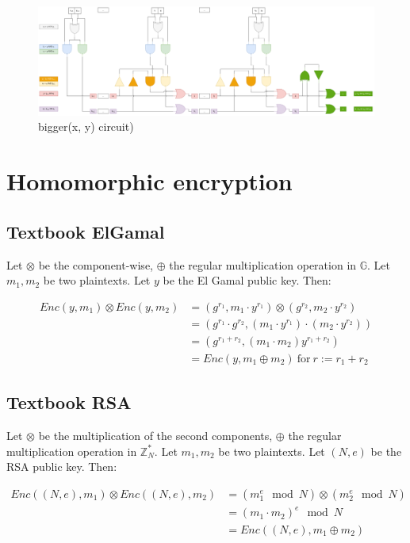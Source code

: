 \documentclass[a4paper]{scrreprt}
\begin{document}
\begin{figure}[h]
        \centering
		\includegraphics[width=\textwidth]{1_circuit}
		\caption{bigger(x, y) circuit)}
		\label{fig:circuit}
\end{figure}


\section{Homomorphic encryption}

\subsection{Textbook ElGamal}

Let $\otimes$ be the component-wise, $\oplus$ the regular multiplication
operation in $\mathbb{G}$. Let $m_1, m_2$ be two plaintexts. Let $y$ be the El
Gamal public key. Then:

\begin{align*}
		Enc(y, m_1) \otimes Enc(y, m_2) & = (g^{r_1}, m_1 \cdot y^{r_1}) \otimes (g^{r_2}, m_2 \cdot y^{r_2}) \\ 
										& = (g^{r_1} \cdot g^{r_2}, (m_1 \cdot y^{r_1}) \cdot (m_2 \cdot y^{r_2})) \\
										& = (g^{r_1 + r_2}, (m_1 \cdot m_2) y^{r_1 + r_2}) \\
										& = Enc(y, m_1 \oplus m_2)\ \text{for}\ r := r_1 + r_2
\end{align*}

\subsection{Textbook RSA}

Let $\otimes$ be the multiplication of the second components, $\oplus$ the
regular multiplication operation in $\mathbb{Z}_N^{*}$.  Let $m_1, m_2$ be two
plaintexts. Let $(N, e)$ be the RSA public key. Then:

\begin{align*}
		Enc((N, e), m_1) \otimes Enc((N, e), m_2) & = (m_1^e \mod N) \otimes (m_2^e \mod N) \\
												  & = (m_1 \cdot m_2)^e \mod N \\
												  & = Enc((N, e), m_1 \oplus m_2)
\end{align*}
\end{document}
